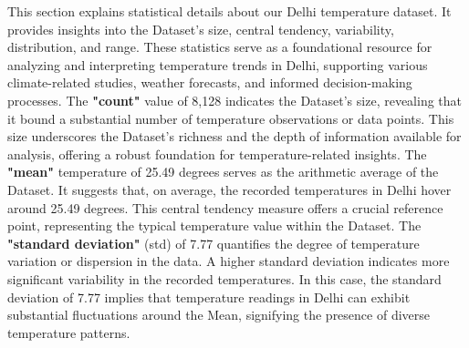 \documentclass[sn-mathphys,Numbered]{sn-jnl}
\theoremstyle{thmstyleone}
\theoremstyle{thmstyletwo}
\theoremstyle{thmstylethree}
\begin{document}
This section explains statistical details about our Delhi temperature dataset. It provides insights into the Dataset's size, central tendency, variability, distribution, and range. These statistics serve as a foundational resource for analyzing and interpreting temperature trends in Delhi, supporting various climate-related studies, weather forecasts, and informed decision-making processes. The \textbf{"count"} value of 8,128 indicates the Dataset's size, revealing that it bound a substantial number of temperature observations or data points. This size underscores the Dataset's richness and the depth of information available for analysis, offering a robust foundation for temperature-related insights. The \textbf{"mean"} temperature of 25.49 degrees serves as the arithmetic average of the Dataset. It suggests that, on average, the recorded temperatures in Delhi hover around 25.49 degrees. This central tendency measure offers a crucial reference point, representing the typical temperature value within the Dataset. The \textbf{"standard deviation"} (std) of 7.77 quantifies the degree of temperature variation or dispersion in the data. A higher standard deviation indicates more significant variability in the recorded temperatures. In this case, the standard deviation of 7.77 implies that temperature readings in Delhi can exhibit substantial fluctuations around the Mean, signifying the presence of diverse temperature patterns.
\end{document}
